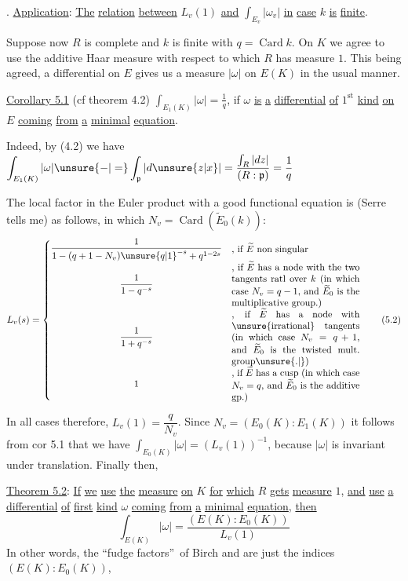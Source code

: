\makeatletter\tagsleft@true{}. \uline{Application}: \uline{The} \uline{relation} \uline{between} $L_v(1)$ \uline{and} $\int_{E_v}|\omega_v|$ \uline{in} \uline{case} $k$ \uline{is} \uline{finite}.

Suppose now $R$ is complete and $k$ is finite with $q=\operatorname{Card} k$. On $K$ we agree to use the additive Haar measure with respect to which $R$ has measure $1$. This being agreed, a differential \inserted{$\omega$} on $E$ gives us a measure $|\omega|$ on $E(K)$ in the usual manner.

\uline{Corollary 5.1} (cf theorem 4.2) $\displaystyle\int_{E_1(K)}|\omega|=\frac{1}{q}$, if $\omega$ \uline{is} \uline{a} \uline{differential} \uline{of} $1^{\mathrm{st}}$ \uline{kind} \uline{on} $E$ \uline{coming} \uline{from} \uline{a} \uline{minimal} \uline{equation}.

Indeed, by (4.2) we have $\displaystyle\int_{E_1(K)}|\omega|\unsure{-|=}\int_{\mathfrak p}|d\unsure{z|x}|=\frac{\int_R|dz|}{(R:\mathfrak p)}=\frac{1}{q}$

The local factor  in the Euler product with a good functional equation is (Serre tells me) as follows, in which $N_v=\operatorname{Card}(\widetilde E_0(k))$:
{\small
\[
L_v(s)=\left\{
\begin{array}{@{}c@{\quad}l@{}}
\dfrac{1}{1-(q+1-N_v){\unsure{q|1}}^{-s}+q^{1-2s}}
 & \parbox{.39\linewidth}{, if $\widetilde E$ non singular}\\[1.0ex]
\dfrac{1}{1-q^{-s}}
 & \parbox{.39\linewidth}{, if $\widetilde E$ has a node with the two tangents ratl over $k$ (in which case $N_v=q-1$, and $\widetilde E_0$ is the multiplicative group.)}\\[1.0ex]
\dfrac{1}{1+q^{-s}}
 & \parbox{.39\linewidth}{, if $\widetilde E$ has a node with \unsure{irrational} tangents (in which case $N_v=q+1$, and $\widetilde E_0$ is the twisted mult. group\unsure{.|{}})}\\[1.0ex]
1 & \parbox{.39\linewidth}{, if $\widetilde E$ has a cusp (in which case $N_v=q$, and $\widetilde E_0$ is the additive gp.)}
\end{array}\right.
\tag*{(5.2)}
\]
}

In all cases therefore, $L_v(1)=\dfrac{q}{N_v}$. Since $N_v=(E_0(K):E_1(K))$\unsure{:|{}} it follows from cor 5.1 that we have $\displaystyle\int_{E_0(K)}|\omega|=(L_v(1))^{-1}$, because $|\omega|$ is invariant under translation. Finally then,

\uline{Theorem 5.2}: \uline{If} \uline{we} \uline{use} \uline{the} \uline{measure} \uline{on} $K$ \uline{for} \uline{which} $R$ \uline{gets} \uline{measure} $1$, \uline{and} \uline{use} \uline{a} \uline{differential} \uline{of} \uline{first} \uline{kind} $\omega$ \uline{coming} \uline{from} \uline{a} \uline{minimal} \uline{equation}, \uline{then}
\[
\int_{E(K)}|\omega|=\frac{(E(K):E_0(K))}{L_v(1)}
\tag*{(5.3)}
\]
In other words, the ``fudge factors''\ of Birch and  are just the indices $(E(K):E_0(K))$,
\clearpage
